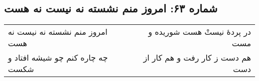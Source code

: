 \begin{center}
\section*{شماره ۶۳: امروز منم نشسته نه نیست نه هست}
\label{sec:063}
\begin{longtable}{l p{0.5cm} r}
امروز منم نشسته نه نیست نه هست
&&
در پردهٔ نیستْ هست شوریده و مست
\\
چه چاره کنم چو شیشه افتاد و شکست
&&
هم دست ز کار رفت و هم کار از دست
\\
\end{longtable}
\end{center}
